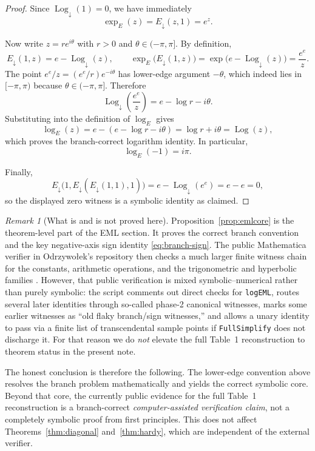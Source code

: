 \documentclass[12pt]{amsart}
\theoremstyle{remark}
\newtheorem*{remark}{Remark}
\newcommand{\Edown}{E_{\downarrow}}
\newcommand{\Logdown}{\operatorname{Log}_{\downarrow}}
\newcommand{\Logpr}{\operatorname{Log}}
\begin{document}
\begin{proof}
Since $\Logdown(1)=0$, we have immediately
\begin{equation}\label{eq:exp-witness}
\exp_E(z)=\Edown(z,1)=e^z.
\end{equation}

Now write $z=re^{i\theta}$ with $r>0$ and $\theta\in(-\pi,\pi]$.  By definition,
\[
\Edown(1,z)=e-\Logdown(z),
\qquad
\exp_E\bigl(\Edown(1,z)\bigr)=\exp\bigl(e-\Logdown(z)\bigr)=\frac{e^e}{z}.
\]
The point $e^e/z=(e^e/r)e^{-i\theta}$ has lower-edge argument $-\theta$, which indeed lies in $[-\pi,\pi)$ because $\theta\in(-\pi,\pi]$.  Therefore
\[
\Logdown\!\left(\frac{e^e}{z}\right)=e-\log r-i\theta.
\]
Substituting into the definition of $\log_E$ gives
\[
\log_E(z)=e-\left(e-\log r-i\theta\right)=\log r+i\theta=\Logpr(z),
\]
which proves the branch-correct logarithm identity.  In particular,
\begin{equation}\label{eq:branch-sign}
\log_E(-1)=i\pi.
\end{equation}

Finally,
\[
\Edown\bigl(1,\Edown(\Edown(1,1),1)\bigr)
= e-\Logdown(e^e)=e-e=0,
\]
so the displayed zero witness is a symbolic identity as claimed.\qedhere
\end{proof}

\begin{remark}[What is and is not proved here]\label{rem:status}
Proposition~\ref{prop:emlcore} is the theorem-level part of the EML section.  It proves the correct branch convention and the key negative-axis sign identity \eqref{eq:branch-sign}.  The public Mathematica verifier in Odrzywo\l{}ek's repository then checks a much larger finite witness chain for the constants, arithmetic operations, and the trigonometric and hyperbolic families \cite{OdrzywolekVerifier2026}.  However, that public verification is mixed symbolic--numerical rather than purely symbolic: the script comments out direct checks for \texttt{logEML}, routes several later identities through so-called phase-2 canonical witnesses, marks some earlier witnesses as ``old flaky branch/sign witnesses,'' and allows a unary identity to pass via a finite list of transcendental sample points if \texttt{FullSimplify} does not discharge it.  For that reason we do \emph{not} elevate the full Table~1 reconstruction to theorem status in the present note.

The honest conclusion is therefore the following.  The lower-edge convention above resolves the branch problem mathematically and yields the correct symbolic core.  Beyond that core, the currently public evidence for the full Table~1 reconstruction is a branch-correct \emph{computer-assisted verification claim}, not a completely symbolic proof from first principles.  This does not affect Theorems~\ref{thm:diagonal} and~\ref{thm:hardy}, which are independent of the external verifier.
\end{remark}
\end{document}
